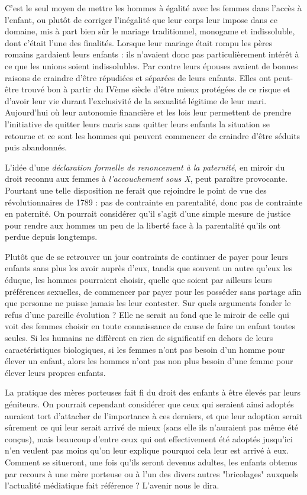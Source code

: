  C'est le seul moyen de mettre les hommes à égalité avec les femmes dans l'accès à l'enfant, ou plutôt de corriger l'inégalité que leur corps leur impose dans ce domaine, mis à part bien sûr le mariage traditionnel, monogame et indissoluble, dont c'était l'une des finalités. Lorsque leur mariage était rompu les pères romains gardaient leurs enfants : ils n'avaient donc pas particulièrement intérêt à ce que les unions soient indissolubles. Par contre leurs épouses avaient de bonnes raisons de craindre d'être répudiées et séparées de leurs enfants. Elles ont peut-être trouvé bon à partir du IVème siècle d'être mieux protégées de ce risque et d'avoir leur vie durant l'exclusivité de la sexualité légitime de leur mari. Aujourd'hui où leur autonomie financière et les lois leur permettent de prendre l'initiative de quitter leurs maris sans quitter leurs enfants la situation se retourne et ce sont les hommes qui peuvent commencer de craindre d'être séduits puis abandonnés. 
 
 L'idée d'une {\emph{déclaration formelle de renoncement à la paternité}}, en miroir du droit reconnu aux femmes à \emph{l'accouchement sous X}, peut paraître provocante. Pourtant une telle disposition ne ferait que rejoindre le point de vue des révolutionnaires de 1789 : pas de contrainte en parentalité, donc pas de contrainte en paternité. On pourrait considérer qu'il s'agit d'une simple mesure de justice pour rendre aux hommes un peu de la liberté face à la parentalité qu'ils ont perdue depuis longtemps.

 Plutôt que de se retrouver un jour contraints de continuer de payer pour leurs enfants sans plus les avoir auprès d'eux, tandis que souvent un autre qu'eux les éduque, les hommes pourraient choisir, quelle que soient par ailleurs leurs préférences sexuelles, de commencer par payer pour les posséder sans partage afin que personne ne puisse jamais les leur contester. Sur quels arguments fonder le refus d'une pareille évolution ? Elle ne serait au fond que le miroir de celle qui voit des femmes choisir en toute connaissance de cause de faire un enfant toutes seules. Si les humains ne diffèrent en rien de significatif en dehors de leurs caractéristiques biologiques, si les femmes n'ont pas besoin d'un homme pour élever un enfant, alors les hommes n'ont pas non plus besoin d'une femme pour élever leurs propres enfants.
 
 La pratique des mères porteuses fait fi du droit des enfants à être élevés par leurs géniteurs. On pourrait cependant considérer que ceux qui seraient ainsi adoptés auraient tort d'attacher de l'importance à ces derniers, et que leur adoption serait sûrement ce qui leur serait arrivé de mieux (sans elle ils n'auraient pas même été conçus), mais beaucoup d'entre ceux qui ont effectivement été adoptés jusqu'ici n'en veulent pas moins qu'on leur explique pourquoi cela leur est arrivé à eux. Comment se situeront, une fois qu'ils seront devenus adultes, les enfants obtenus par recours à une mère porteuse ou à l'un des divers autres "bricolages" auxquels l'actualité médiatique fait référence ? L'avenir nous le dira.   

